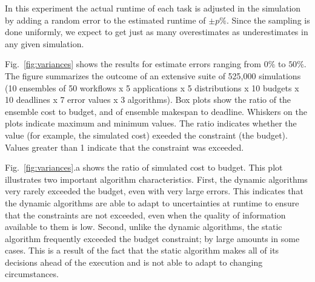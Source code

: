 \documentclass[conference]{IEEEtran}
\begin{document}
In this experiment the actual runtime of each task is adjusted in the
simulation by adding a random error to the estimated runtime of $\pm p\%$.
Since the sampling is done uniformly, we expect to get just as many
overestimates as underestimates in any given simulation.

Fig.~\ref{fig:variances} shows the results for estimate errors
ranging from $0\%$ to $50\%$. The figure summarizes the outcome of an
extensive suite of 525,000 simulations (10 ensembles of 50 workflows x 5
applications x 5 distributions x 10 budgets x 10 deadlines x 7 error values x
3 algorithms). Box plots show the ratio of the ensemble cost to
budget, and of ensemble makespan to deadline. Whiskers on the plots
indicate maximum and minimum values. The ratio indicates whether the value 
(for example, the simulated cost) exeeded the constraint (the budget). Values
greater than 1 indicate that the constraint was exceeded. 

Fig.~\ref{fig:variances}.a shows the ratio of simulated cost to budget. This
plot illustrates two important algorithm characteristics. First, the dynamic
algorithms very rarely exceeded the budget, even with very large errors. This
indicates that the dynamic algorithms are able to adapt to uncertainties at
runtime to ensure that the constraints are not exceeded, even when the quality
of information available to them is low. Second, unlike the dynamic
algorithms, the static algorithm frequently exceeded the budget constraint; by
large amounts in some cases. This is a result of the fact that the static
algorithm makes all of its decisions ahead of the execution and is not able to adapt
to changing circumstances.

\end{document}
